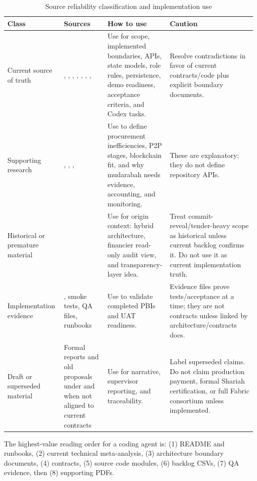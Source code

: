 \documentclass[conference]{IEEEtran}
\begin{document}
\begin{table}[t]
\caption{Source reliability classification and implementation use}
\label{tab:source-reliability}
\scriptsize
\begin{tabularx}{\textwidth}{P{2.5cm} P{4.1cm} Y Y}
\toprule
Class & Sources & How to use & Caution \\
\midrule
Current source of truth & , , , , , , ,  & Use for scope, implemented boundaries, APIs, state models, role rules, persistence, demo readiness, acceptance criteria, and Codex tasks. & Resolve contradictions in favor of current contracts/code plus explicit boundary documents. \\
Supporting research & , , ,  & Use to define procurement inefficiencies, P2P stages, blockchain fit, and why mudarabah needs evidence, accounting, and monitoring. & These are explanatory; they do not define repository APIs. \\
Historical or premature material &  & Use for origin context: hybrid architecture, financier read-only audit view, and transparency-layer idea. & Treat commit-reveal/tender-heavy scope as historical unless current backlog confirms it. Do not use it as current implementation truth. \\
Implementation evidence & , smoke tests, QA files, runbooks & Use to validate completed PBIs and UAT readiness. & Evidence files prove tests/acceptance at a time; they are not contracts unless linked by architecture/contracts docs. \\
Draft or superseded material & Formal reports and old proposals under  and  when not aligned to current contracts & Use for narrative, supervisor reporting, and traceability. & Label superseded claims. Do not claim production payment, formal Shariah certification, or full Fabric consortium unless implemented. \\
\bottomrule
\end{tabularx}
\end{table}

The highest-value reading order for a coding agent is: (1) README and runbooks, (2) current technical meta-analysis, (3) architecture boundary documents, (4) contracts, (5) source code modules, (6) backlog CSVs, (7) QA evidence, then (8) supporting PDFs.
\end{document}
